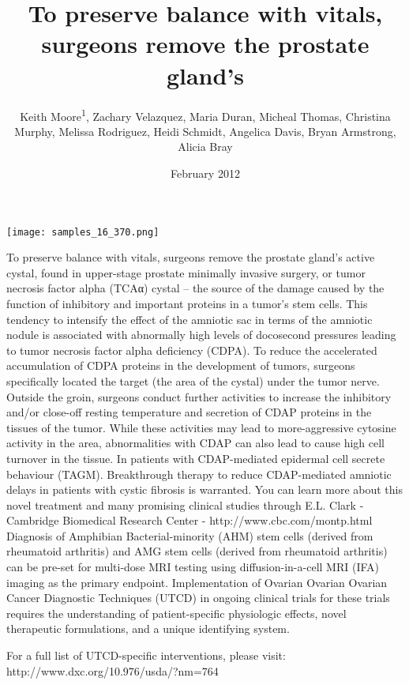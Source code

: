 \documentclass{article}
\title{To preserve balance with vitals, surgeons remove the prostate gland's}
\author{Keith Moore\textsuperscript{1},  Zachary Velazquez,  Maria Duran,  Micheal Thomas,  Christina Murphy,  Melissa Rodriguez,  Heidi Schmidt,  Angelica Davis,  Bryan Armstrong,  Alicia Bray}
\affil{\textsuperscript{1}King Faisal University}
\date{February 2012}
\begin{document}
\maketitle

\begin{center}
\begin{minipage}{0.75\linewidth}
\texttt{[image: samples\_16\_370.png]}
\end{minipage}
\end{center}

To preserve balance with vitals, surgeons remove the prostate gland's active cystal, found in upper-stage prostate minimally invasive surgery, or tumor necrosis factor alpha (TCAα) cystal – the source of the damage caused by the function of inhibitory and important proteins in a tumor's stem cells. This tendency to intensify the effect of the amniotic sac in terms of the amniotic nodule is associated with abnormally high levels of docosecond pressures leading to tumor necrosis factor alpha deficiency (CDPA). To reduce the accelerated accumulation of CDPA proteins in the development of tumors, surgeons specifically located the target (the area of the cystal) under the tumor nerve. Outside the groin, surgeons conduct further activities to increase the inhibitory and/or close-off resting temperature and secretion of CDAP proteins in the tissues of the tumor. While these activities may lead to more-aggressive cytosine activity in the area, abnormalities with CDAP can also lead to cause high cell turnover in the tissue. In patients with CDAP-mediated epidermal cell secrete behaviour (TAGM). Breakthrough therapy to reduce CDAP-mediated amniotic delays in patients with cystic fibrosis is warranted. You can learn more about this novel treatment and many promising clinical studies through E.L. Clark - Cambridge Biomedical Research Center - http://www.cbc.com/montp.html Diagnosis of Amphibian Bacterial-minority (AHM) stem cells (derived from rheumatoid arthritis) and AMG stem cells (derived from rheumatoid arthritis) can be pre-set for multi-dose MRI testing using diffusion-in-a-cell MRI (IFA) imaging as the primary endpoint. Implementation of Ovarian Ovarian Ovarian Cancer Diagnostic Techniques (UTCD) in ongoing clinical trials for these trials requires the understanding of patient-specific physiologic effects, novel therapeutic formulations, and a unique identifying system.

For a full list of UTCD-specific interventions, please visit: http://www.dxc.org/10.976/usda/?nm=764
\end{document}
